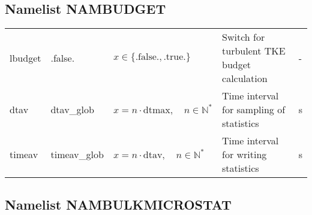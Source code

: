 \documentclass[twoside,11pt,fleqn,a4paper,english,openright]{report}
\begin{document}
\subsection{Namelist NAMBUDGET}\label{par:budget}

\begin{center}
  \tablelasttail{
        &&&&\\\hline
  }
\begin{supertabular}{|l|p{2cm}|p{4cm}|p{6cm}|l|}
  lbudget	& .false.	& $x\in\{\text{.false.},\text{.true.}\}$		& Switch for turbulent TKE budget calculation	& -\\
  dtav		& dtav\_glob	& $x = n \cdot \text{dtmax}, \quad n \in \mathbb{N}^*$	& Time interval for sampling of statistics	& s\\
  timeav	& timeav\_glob	& $x = n \cdot \text{dtav}, \quad n \in \mathbb{N}^*$	& Time interval for writing statistics		& s\\
\end{supertabular}
\end{center}

\subsection{Namelist NAMBULKMICROSTAT}\label{par:bulkmicrostat}
\end{document}
